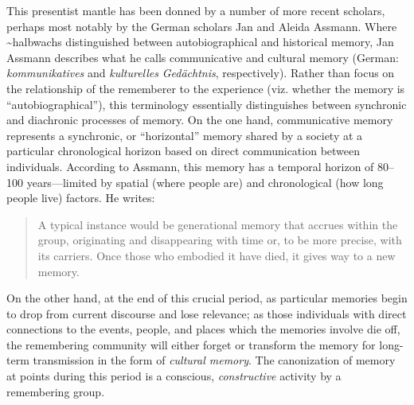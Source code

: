 This presentist mantle has been donned by a number of more recent
scholars, perhaps most notably by the German scholars Jan and Aleida
Assmann.\autocites[See
esp.][]{assmann_nikulin2015}{assmann2011}[and][]{a_assmann2011} Where
\textasciitilde{}halbwachs distinguished between autobiographical and
historical memory, Jan Assmann describes what he calls communicative and
cultural memory (German: \emph{kommunikatives} and \emph{kulturelles}
\emph{Gedächtnis}, respectively).\autocites[36]{assmann2011}[For a
concise terminological crash-course,
see][182--183]{hubenthal_carstens-hasselbalch2012} Rather than focus on
the relationship of the rememberer to the experience (viz. whether the
memory is ``autobiographical''), this terminology essentially
distinguishes between synchronic and diachronic processes of memory. On
the one hand, communicative memory represents a synchronic, or
``horizontal'' memory shared by a society at a particular chronological
horizon based on direct communication between individuals. According to
Assmann, this memory has a temporal horizon of 80--100 years---limited
by spatial (where people are) and chronological (how long people live)
factors. He writes:

\begin{quote}
A typical instance would be generational memory that accrues within the
group, originating and disappearing with time or, to be more precise,
with its carriers. Once those who embodied it have died, it gives way to
a new memory.\autocite[36]{assmann2011}
\end{quote}

On the other hand, at the end of this crucial period, as particular
memories begin to drop from current discourse and lose relevance; as
those individuals with direct connections to the events, people, and
places which the memories involve die off, the remembering community
will either forget or transform the memory for long-term transmission in
the form of \emph{cultural memory}. The canonization of memory at points
during this period is a conscious, \emph{constructive} activity by a
remembering group. \autocite[45]{assmann2011}

